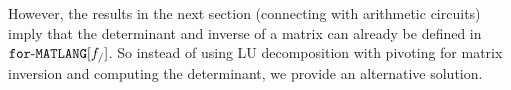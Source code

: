%
%
However, the results
in the next section (connecting \langfor with arithmetic circuits) imply that the determinant
and inverse of a matrix can already be defined in $\texttt{for}\text{-}\texttt{MATLANG}[f_/]$. So instead of using LU decomposition with pivoting for matrix inversion and computing the determinant, we provide an alternative solution.

